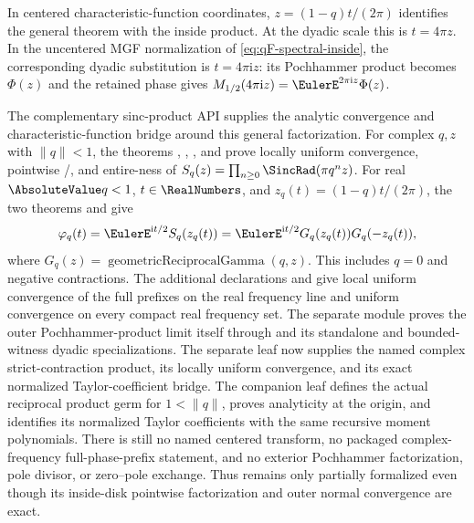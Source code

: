 \documentclass[11pt,a4paper,oneside,openany]{book}
\theoremstyle{definition}
\theoremstyle{remark}
\begin{document}
In centered characteristic-function coordinates,
$z=(1-q)t/(2\pi)$ identifies the general theorem with the inside product.
At the dyadic scale this is $t=4\pi z$.  In the uncentered MGF normalization
of \eqref{eq:qF-spectral-inside}, the corresponding dyadic substitution is
$t=4\pi\mathrm i z$: its Pochhammer product becomes $\Phi(z)$ and the retained
phase gives $M_{1/2}(4\pi\mathrm i z)=\EulerE^{2\pi\mathrm i z}\Phi(z)$.

The complementary sinc-product API supplies the analytic convergence and
characteristic-function bridge around this general factorization.  For
complex $q,z$ with $\lVert q\rVert<1$, the theorems
,
,
, and
 prove locally uniform convergence,
pointwise /, and entire-ness of
$S_q(z)=\prod_{n\ge0}\SincRad(\pi q^nz)$.  For real
$\AbsoluteValue q<1$, $t\in\RealNumbers$, and $z_q(t)=(1-q)t/(2\pi)$, the two theorems
and
give
\[
 \varphi_q(t)=\EulerE^{\mathrm i t/2}S_q(z_q(t))
 =\EulerE^{\mathrm i t/2}G_q(z_q(t))G_q(-z_q(t)),
\]
where $G_q(z)=\operatorname{geometricReciprocalGamma}(q,z)$.  This includes
$q=0$ and negative contractions.  The additional declarations
 and
 give local uniform convergence
of the full prefixes on the real frequency line and uniform convergence on
every compact real frequency set.  The separate module
 proves the outer
Pochhammer-product limit itself through
 and
its standalone and bounded-witness dyadic specializations.  The separate
 leaf now supplies the named
complex strict-contraction product, its locally uniform convergence, and its
exact normalized Taylor-coefficient bridge.  The companion
 leaf defines the actual
reciprocal product germ for $1<\lVert q\rVert$, proves analyticity at the
origin, and identifies its normalized Taylor coefficients with the same
recursive moment polynomials.  There is still no named centered transform, no
packaged complex-frequency full-phase-prefix statement, and no exterior
Pochhammer factorization, pole divisor, or zero--pole exchange.  Thus
 remains only partially formalized even though its
inside-disk pointwise factorization and outer normal convergence are exact.
\end{document}
